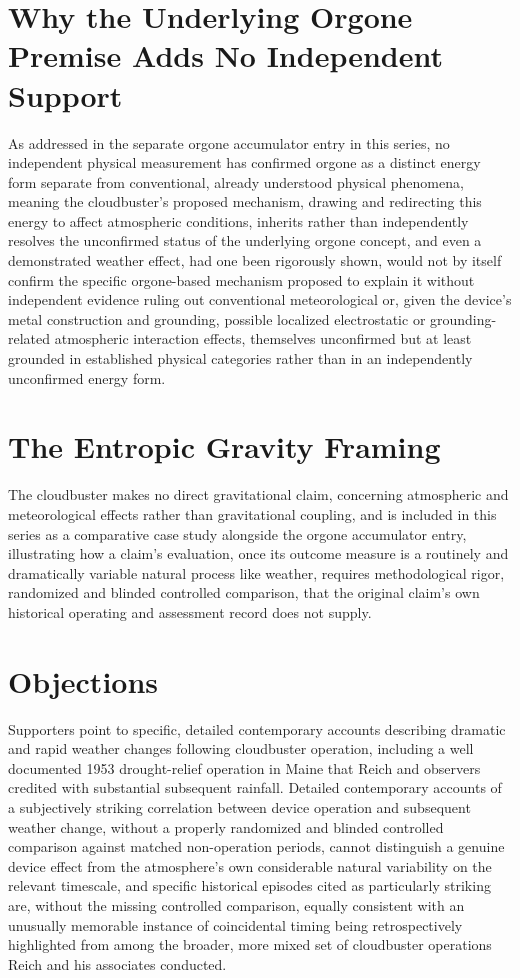 \documentclass[11pt]{article}
\begin{document}
\section{Why the Underlying Orgone Premise Adds No Independent Support}

As addressed in the separate orgone accumulator entry in this series, no independent physical measurement has confirmed orgone as a distinct energy form separate from conventional, already understood physical phenomena, meaning the cloudbuster's proposed mechanism, drawing and redirecting this energy to affect atmospheric conditions, inherits rather than independently resolves the unconfirmed status of the underlying orgone concept, and even a demonstrated weather effect, had one been rigorously shown, would not by itself confirm the specific orgone-based mechanism proposed to explain it without independent evidence ruling out conventional meteorological or, given the device's metal construction and grounding, possible localized electrostatic or grounding-related atmospheric interaction effects, themselves unconfirmed but at least grounded in established physical categories rather than in an independently unconfirmed energy form.

\section{The Entropic Gravity Framing}

The cloudbuster makes no direct gravitational claim, concerning atmospheric and meteorological effects rather than gravitational coupling, and is included in this series as a comparative case study alongside the orgone accumulator entry, illustrating how a claim's evaluation, once its outcome measure is a routinely and dramatically variable natural process like weather, requires methodological rigor, randomized and blinded controlled comparison, that the original claim's own historical operating and assessment record does not supply.

\section{Objections}

Supporters point to specific, detailed contemporary accounts describing dramatic and rapid weather changes following cloudbuster operation, including a well documented 1953 drought-relief operation in Maine that Reich and observers credited with substantial subsequent rainfall. Detailed contemporary accounts of a subjectively striking correlation between device operation and subsequent weather change, without a properly randomized and blinded controlled comparison against matched non-operation periods, cannot distinguish a genuine device effect from the atmosphere's own considerable natural variability on the relevant timescale, and specific historical episodes cited as particularly striking are, without the missing controlled comparison, equally consistent with an unusually memorable instance of coincidental timing being retrospectively highlighted from among the broader, more mixed set of cloudbuster operations Reich and his associates conducted.
\end{document}
